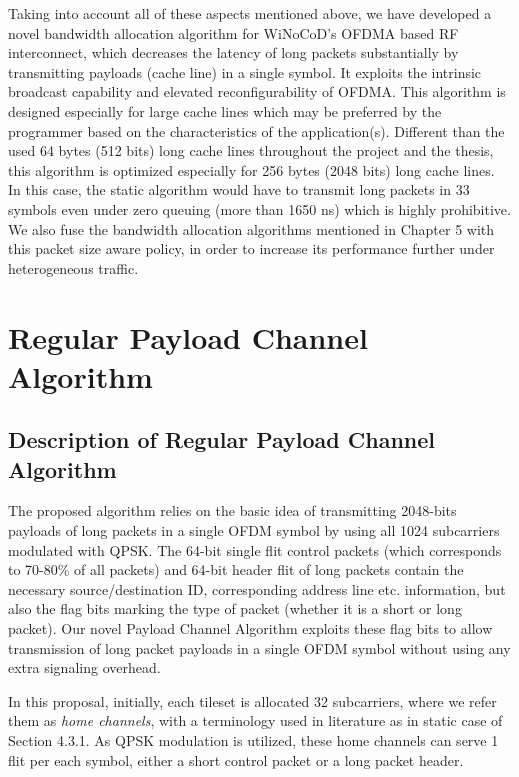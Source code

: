 Taking into account all of these aspects mentioned above, we have developed a novel bandwidth allocation algorithm for WiNoCoD's OFDMA based RF interconnect, which decreases the latency of long packets substantially by transmitting payloads (cache line) in a single symbol. It exploits the intrinsic broadcast capability and elevated reconfigurability of OFDMA. This algorithm is designed especially for large cache lines which may be preferred by the programmer based on the characteristics of the application(s). Different than the used 64 bytes (512 bits) long cache lines throughout the project and the thesis, this algorithm is optimized especially for 256 bytes (2048 bits) long cache lines. In this case, the static algorithm would have to transmit long packets in 33 symbols even under zero queuing (more than 1650 ns) which is highly prohibitive. We also fuse the bandwidth allocation algorithms mentioned in Chapter 5 with this packet size aware policy, in order to increase its performance further under heterogeneous traffic.  

\section{Regular Payload Channel Algorithm}


\subsection{Description of Regular Payload Channel Algorithm}

The proposed algorithm relies on the basic idea of transmitting 2048-bits payloads of long packets in a single OFDM symbol by using all 1024 subcarriers modulated with QPSK. The 64-bit single flit control packets (which corresponds to 70-80\% of all packets) and 64-bit header flit of long packets contain the necessary source/destination ID, corresponding address line etc. information, but also the flag bits marking the type of packet (whether it is a short or long packet). Our novel Payload Channel Algorithm exploits these flag bits to allow transmission of long packet payloads in a single OFDM symbol without using any extra signaling overhead. 

In this proposal, initially, each tileset is allocated 32 subcarriers, where we refer them as \textit{home channels}, with a terminology used in literature as in static case of Section 4.3.1. As QPSK modulation is utilized, these home channels can serve 1 flit per each symbol, either a short control packet or a long packet header. 

